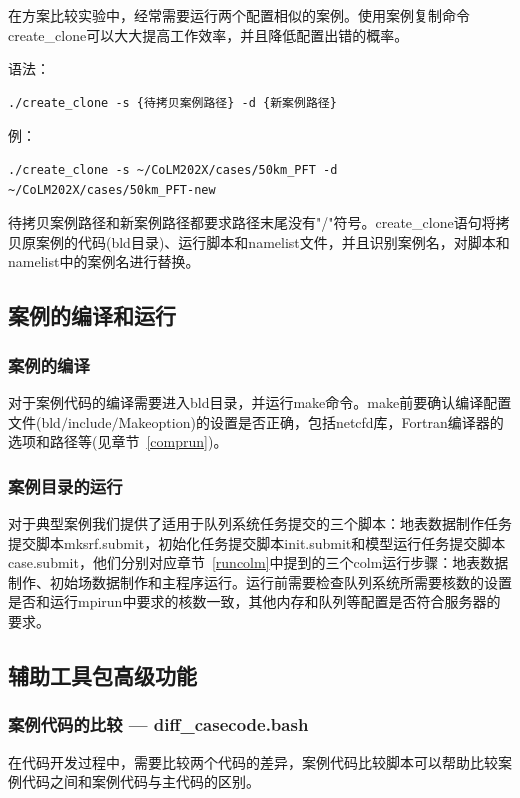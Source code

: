 在方案比较实验中，经常需要运行两个配置相似的案例。使用案例复制命令create\_clone可以大大提高工作效率，并且降低配置出错的概率。

语法：
\begin{lstlisting}[xleftmargin=2.5em]
./create_clone -s {待拷贝案例路径} -d {新案例路径}
\end{lstlisting}

例：
\begin{lstlisting}[xleftmargin=2.5em]
./create_clone -s ~/CoLM202X/cases/50km_PFT -d ~/CoLM202X/cases/50km_PFT-new
\end{lstlisting}

待拷贝案例路径和新案例路径都要求路径末尾没有"/"符号。create\_clone语句将拷贝原案例的代码(bld目录)、运行脚本和namelist文件，并且识别案例名，对脚本和namelist中的案例名进行替换。

\subsection{案例的编译和运行}
\subsubsection{案例的编译}
对于案例代码的编译需要进入bld目录，并运行make命令。make前要确认编译配置文件(bld$\slash$include$\slash$Makeoption)的设置是否正确，包括netcfd库，Fortran编译器的选项和路径等(见章节~\ref{comprun})。

\subsubsection{案例目录的运行}
对于典型案例我们提供了适用于队列系统任务提交的三个脚本：地表数据制作任务提交脚本mksrf.submit，初始化任务提交脚本init.submit和模型运行任务提交脚本case.submit，他们分别对应章节~\ref{runcolm}中提到的三个colm运行步骤：地表数据制作、初始场数据制作和主程序运行。运行前需要检查队列系统所需要核数的设置是否和运行mpirun中要求的核数一致，其他内存和队列等配置是否符合服务器的要求。

\subsection{辅助工具包高级功能}

\subsubsection{案例代码的比较 --- diff\_casecode.bash}

在代码开发过程中，需要比较两个代码的差异，案例代码比较脚本可以帮助比较案例代码之间和案例代码与主代码的区别。

